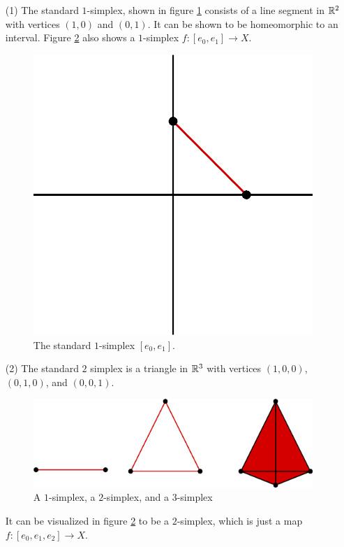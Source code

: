 \begin{example}\label{example_1.12}
    \begin{enumerate}
        \item[(1)] The standard $1$-simplex, shown in figure \ref{figure_1.7}
            consists of a line segment in $\mathbb{R}^2$ with vertices $(1,0)$ and $(0,1)$.
            It can be shown to be homeomorphic to an interval. Figure
            \ref{figure_1.8} also shows a $1$-simplex  $f:[e_0,e_1]
            \xrightarrow{} X$.
            \begin{figure}[h]
                \centering
                \includegraphics[scale=0.5]{Figures/Chapter1/standard_1_simplex.eps}
                \caption{The standard $1$-simplex  $[e_0,e_1]$.}
                \label{figure_1.7}
            \end{figure}

        \item[(2)] The standard $2$ simplex is a triangle in  $\mathbb{R}^3$ with
            vertices  $(1,0,0)$, $(0,1,0)$, and $(0,0,1)$.
            \begin{figure}[h]
                \centering
                \includegraphics[scale=0.5]{Figures/Chapter1/simplices.eps}
                \caption{A $1$-simplex, a  $2$-simplex, and a  $3$-simplex}
                \label{figure_1.8}
            \end{figure}
            It can be visualized in figure \ref{figure_1.8} to be a $2$-simplex,
            which is just a map  $f:[e_0,e_1,e_2] \xrightarrow{} X$.


\end{enumerate}
\end{example}

